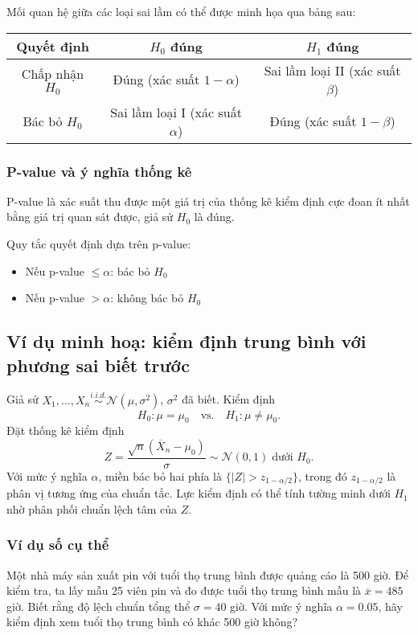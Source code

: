 Mối quan hệ giữa các loại sai lầm có thể được minh họa qua bảng sau:

\begin{center}
\begin{tabular}{|c|c|c|}
\hline
\textbf{Quyết định} & \textbf{$H_0$ đúng} & \textbf{$H_1$ đúng} \\
\hline
Chấp nhận $H_0$ & Đúng (xác suất $1-\alpha$) & Sai lầm loại II (xác suất $\beta$) \\
\hline
Bác bỏ $H_0$ & Sai lầm loại I (xác suất $\alpha$) & Đúng (xác suất $1-\beta$) \\
\hline
\end{tabular}
\end{center}

\subsubsection*{P-value và ý nghĩa thống kê}
\begin{dn}[P-value]
P-value là xác suất thu được một giá trị của thống kê kiểm định cực đoan ít nhất bằng giá trị quan sát được, giả sử $H_0$ là đúng.
\end{dn}

Quy tắc quyết định dựa trên p-value:
\begin{itemize}
    \item Nếu p-value $\leq \alpha$: bác bỏ $H_0$
    \item Nếu p-value $> \alpha$: không bác bỏ $H_0$
\end{itemize}

\subsection{Ví dụ minh hoạ: kiểm định trung bình với phương sai biết trước}
Giả sử $X_1,\ldots,X_n\overset{i.i.d.}{\sim}\mathcal{N}(\mu,\sigma^2)$, $\sigma^2$ đã biết. Kiểm định
\[
H_0:\mu=\mu_0 \quad \text{vs.}\quad H_1:\mu\ne\mu_0.
\]
Đặt thống kê kiểm định
\[
Z=\frac{\sqrt{n}(\overline{X}_n-\mu_0)}{\sigma} \sim \mathcal{N}(0,1)\;\text{dưới } H_0.
\]
Với mức ý nghĩa $\alpha$, miền bác bỏ hai phía là $\{|Z|>z_{1-\alpha/2}\}$, trong đó $z_{1-\alpha/2}$ là phân vị tương ứng của chuẩn tắc. Lực kiểm định có thể tính tường minh dưới $H_1$ nhờ phân phối chuẩn lệch tâm của $Z$.

\subsubsection*{Ví dụ số cụ thể}
Một nhà máy sản xuất pin với tuổi thọ trung bình được quảng cáo là 500 giờ. Để kiểm tra, ta lấy mẫu 25 viên pin và đo được tuổi thọ trung bình mẫu là $\overline{x} = 485$ giờ. Biết rằng độ lệch chuẩn tổng thể $\sigma = 40$ giờ. Với mức ý nghĩa $\alpha = 0.05$, hãy kiểm định xem tuổi thọ trung bình có khác 500 giờ không?

